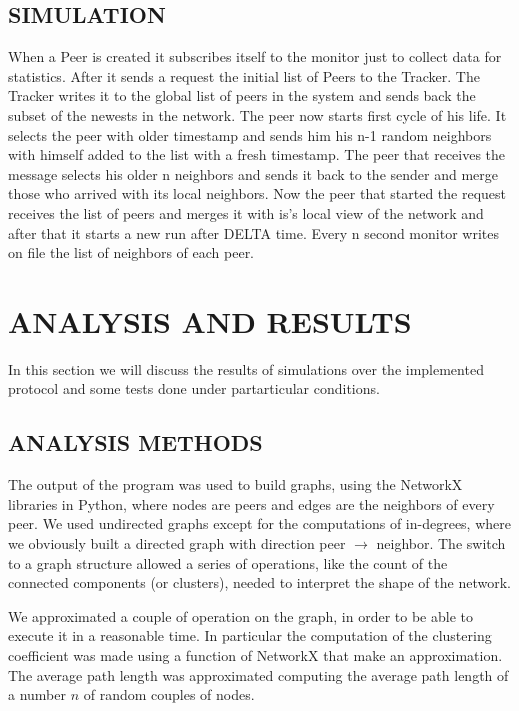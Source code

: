 \documentclass[a4paper,12pt,notitlepage]{article} %
\begin{document}
\subsection{SIMULATION}
	When a Peer is created it subscribes itself to the monitor  just to collect data for statistics. After it sends a 
request the initial list of Peers to the Tracker. The Tracker writes it to the global list of peers in the system and sends 
back the subset of the newests in the network. The peer now starts first cycle of his life. It selects the peer with older 
timestamp and sends him his n-1 random neighbors with himself added to the list with a fresh timestamp. The peer that receives 
the message selects his older n neighbors and sends it back to the sender and merge those who arrived with its local 
neighbors. Now the peer that started the request receives the list of peers and merges it with is's local view of the network 
and after that it starts a new run after DELTA time. Every n second monitor writes on file the list of neighbors of each 
peer.





\section{ANALYSIS AND RESULTS}

In this section we will discuss the results of simulations over the implemented protocol and some tests done under
 partarticular conditions.

\subsection{ANALYSIS METHODS}

The output of the program was used to build  graphs, using the NetworkX libraries\cite{netwx} in Python, where
 nodes are peers and edges are the neighbors of every peer. We used undirected graphs except for the 
 computations of in-degrees, where we obviously built a directed graph with direction peer \(\rightarrow\) neighbor.
 The switch to a graph structure allowed a series of operations, like the count of the connected components (or clusters), 
 needed to interpret the shape of the network.

We approximated a couple of operation on the graph, in order to be able to execute it in a reasonable time. In 
 particular the computation of the clustering coefficient was made using a function of NetworkX that make an 
approximation. The average path length was approximated computing the average path length of a number 
\(n\) of random couples of nodes.
\end{document}

